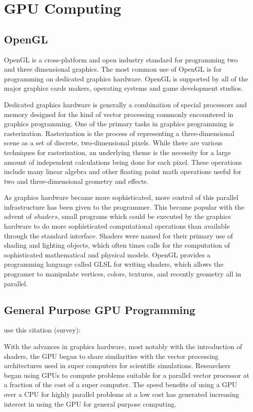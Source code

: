\chapter{GPU Computing}

\section{OpenGL}
OpenGL is a cross-platform and open industry standard for programming two and
three dimensional graphics.\cite{OpenGL} The most common use of OpenGL is for programming on
dedicated graphics hardware. OpenGL is supported by all of the major graphics
cards makers, operating systems and game development studios.


Dedicated graphics hardware is generally a combination of special processors
and memory designed for the kind of vector processing commonly encountered in
graphics programming. One of the primary tasks in graphics programming is
rasterization. Rasterization is the process of representing a three-dimensional
scene as a set of discrete, two-dimensional pixels. While there are various
techniques for rasterization, an underlying theme is the necessity for a large
amount of independent calculations being done for each pixel. These operations
include many linear algebra and other floating point math operations useful for
two and three-dimensional geometry and effects.


As graphics hardware became more sophisticated, more control of this parallel
infrastructure has been given to the programmer. This became popular with the
advent of $shaders$, small programs which could be executed by the graphics
hardware to do more sophisticated computational operations than available
through the standard interface. Shaders were named for their primary use of
shading and lighting objects, which often times calls for the computation of
sophisticated mathematical and physical models. OpenGL provides a programming
language called GLSL for writing shaders, which allows the programer to
manipulate vertices, colors, textures, and recently geometry all in parallel.


\section{General Purpose GPU Programming}

use this citation (survey): \cite{Owens2007}

With the advances in graphics hardware, most notably with the introduction of
shaders, the GPU began to share similarities with the vector processing
architectures used in super computers for scientific simulations. Researchers
began using GPUs to compute problems suitable for a parallel vector processor
at a fraction of the cost of a super computer. The speed benefits of using a
GPU over a CPU for highly parallel problems at a low cost has generated
increasing interest in using the GPU for general purpose computing.

